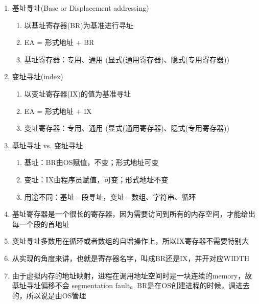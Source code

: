 \documentclass[]{report}
\begin{document}
		\begin{enumerate}
			\item 基址寻址(Base or Displacement addressing)
			\begin{enumerate}
				\item 以基址寄存器(BR)为基准进行寻址
				\item EA = 形式地址 + BR
				\item 基址寄存器：专用、通用 (显式(通用寄存器)、隐式(专用寄存器))
			\end{enumerate}
			\item 变址寻址(index)
			\begin{enumerate}
				\item 以变址寄存器(IX)的值为基准寻址
				\item EA = 形式地址 + IX
				\item 变址寄存器：专用、通用 (显式(通用寄存器)、隐式(专用寄存器))
			\end{enumerate}
			\item 基址寻址 vs. 变址寻址
			\begin{enumerate}
				\item 基址：BR由OS赋值，不变；形式地址可变
				\item 变址：IX由程序员赋值，可变；形式地址不变
				\item 用途不同：基址—段寻址，变址—数组、字符串、循环
			\end{enumerate}
			\item 基址寄存器是一个很长的寄存器，因为需要访问到所有的内存空间，才能给出每一个段的首地址
			\item 变址寻址多数用在循环或者数组的自增操作上，所以IX寄存器不需要特别大
			\item 从实现的角度来讲，也就是寄存器名字，叫成BR还是IX，并开对应WIDTH
			\item 由于虚拟内存的地址映射，进程在调用地址空间时是一块连续的memory，故基址寻址偏移不会 segmentation fault。BR是在OS创建进程的时候，调进去的，所以说是由OS管理
		\end{enumerate}
\end{document}
